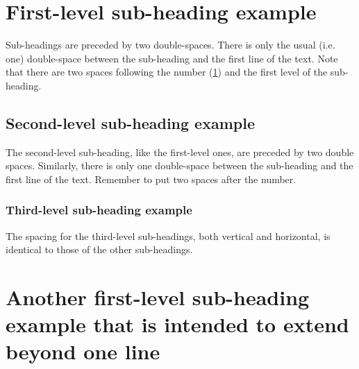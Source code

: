 \section{First-level sub-heading example} \label{firssubsection}

Sub-headings are preceded by two double-spaces. There is only the usual (i.e. one)
double-space between the sub-heading and the first line of the text. Note that there
are two spaces following the number (\ref{firssubsection}) and the first level of the sub-heading.

\subsection{Second-level sub-heading example}

The second-level sub-heading, like the first-level ones, are preceded by two double
spaces. Similarly, there is only one double-space between the sub-heading and the
first line of the text. Remember to put two spaces after the number.

\subsubsection{Third-level sub-heading example}

The spacing for the third-level sub-headings, both vertical and horizontal, is identical
to those of the other sub-headings.

\section{Another first-level sub-heading example that is intended to extend beyond one line}
